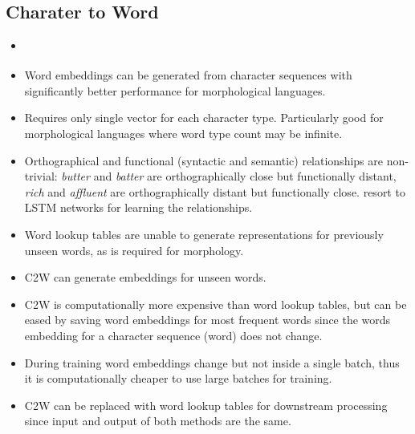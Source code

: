 \documentclass[12pt,a4paper,english
]{tutthesis}
\begin{document}
\subsection{Charater to Word}
\begin{itemize}
\item \cite{Ling2015}
\item Word embeddings can be generated from character sequences with significantly better performance for morphological languages.
\item Requires only single vector for each character type. Particularly good for morphological languages where word type count may be infinite.
\item Orthographical and functional (syntactic and semantic) relationships are non-trivial: \textit{butter} and \textit{batter} are orthographically close but functionally distant, \textit{rich} and \textit{affluent} are orthographically distant but functionally close. \cite{Ling2015} resort to LSTM networks for learning the relationships.
\item Word lookup tables are unable to generate representations for previously unseen words, as is required for morphology. \cite{Ling2015}
\item C2W can generate embeddings for unseen words.
\item C2W is computationally more expensive than word lookup tables, but can be eased by saving word embeddings for most frequent words since the words embedding for a character sequence (word) does not change.
\item During training word embeddings change but not inside a single batch, thus it is computationally cheaper to use large batches for training.
\item C2W can be replaced with word lookup tables for downstream processing since input and output of both methods are the same.
\end{itemize}
\end{document}
